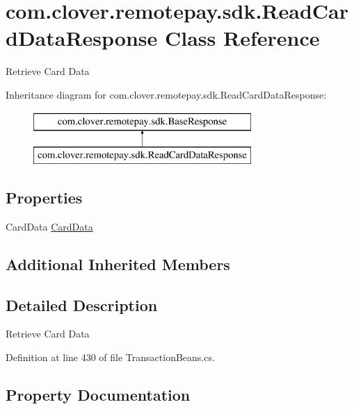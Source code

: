 \hypertarget{classcom_1_1clover_1_1remotepay_1_1sdk_1_1_read_card_data_response}{}\section{com.\+clover.\+remotepay.\+sdk.\+Read\+Card\+Data\+Response Class Reference}
\label{classcom_1_1clover_1_1remotepay_1_1sdk_1_1_read_card_data_response}


Retrieve Card Data  


Inheritance diagram for com.\+clover.\+remotepay.\+sdk.\+Read\+Card\+Data\+Response\+:\begin{figure}[H]
\begin{center}
\leavevmode
\includegraphics[height=2.000000cm]{classcom_1_1clover_1_1remotepay_1_1sdk_1_1_read_card_data_response}
\end{center}
\end{figure}
\subsection*{Properties}
\begin{DoxyCompactItemize}
\item 
Card\+Data \hyperlink{classcom_1_1clover_1_1remotepay_1_1sdk_1_1_read_card_data_response_a1b463be5653f0a2c5f3744cbf9563c9c}{Card\+Data}
\end{DoxyCompactItemize}
\subsection*{Additional Inherited Members}


\subsection{Detailed Description}
Retrieve Card Data 



Definition at line 430 of file Transaction\+Beans.\+cs.



\subsection{Property Documentation}
\mbox{\label{classcom_1_1clover_1_1remotepay_1_1sdk_1_1_read_card_data_response_a1b463be5653f0a2c5f3744cbf9563c9c}} 
